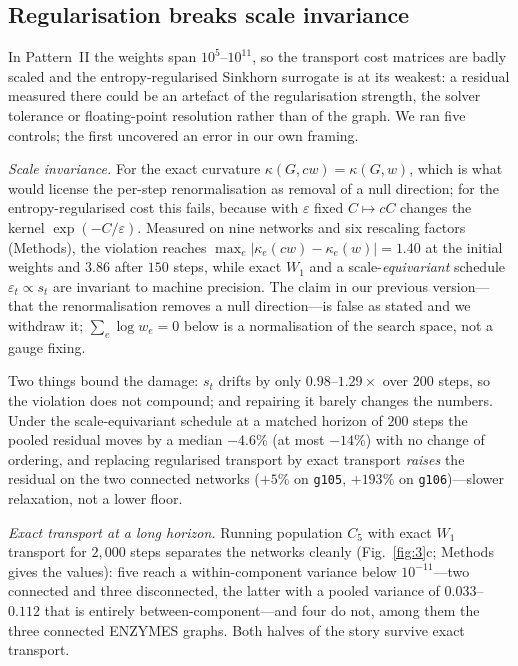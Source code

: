 \documentclass[11pt]{article}
\begin{document}
\subsection*{Regularisation breaks scale invariance}

In Pattern~II the weights span $10^{5}$--$10^{11}$, so the transport cost
matrices are badly scaled and the entropy-regularised Sinkhorn surrogate is at
its weakest: a residual measured there could be an artefact of the
regularisation strength, the solver tolerance or floating-point resolution
rather than of the graph. We ran five controls; the first uncovered
an error in our own framing.

\emph{Scale invariance.} For the exact curvature
$\kappa(G,cw)=\kappa(G,w)$, which is what would license the per-step
renormalisation as removal of a null direction; for the entropy-regularised
cost this fails, because with $\varepsilon$ fixed $C\mapsto cC$ changes the
kernel $\exp(-C/\varepsilon)$. Measured on nine networks and six rescaling
factors (Methods), the violation reaches
$\max_e|\kappa_e(cw)-\kappa_e(w)|=1.40$ at the initial weights and $3.86$
after $150$ steps, while exact $W_1$ and a scale-\emph{equivariant} schedule
$\varepsilon_t\propto s_t$ are invariant to machine precision. The claim in our
previous version---that the renormalisation removes a null direction---is false
as stated and we withdraw it; $\sum_e\log w_e=0$ below is a normalisation of
the search space, not a gauge fixing.

Two things bound the damage: $s_t$ drifts by only $0.98$--$1.29\times$ over
$200$ steps, so the violation does not compound; and repairing it barely
changes the numbers. Under the scale-equivariant schedule at a matched horizon
of $200$ steps the pooled residual moves by a median $-4.6\%$ (at most $-14\%$)
with no change of ordering, and replacing regularised transport by exact
transport \emph{raises} the residual on the two connected networks ($+5\%$ on
\texttt{g105}, $+193\%$ on \texttt{g106})---slower relaxation, not a lower
floor.

\emph{Exact transport at a long horizon.} Running population $C_5$ with exact
$W_1$ transport for $2{,}000$ steps separates the networks cleanly
(Fig.~\ref{fig:3}c; Methods gives the values): five reach a within-component
variance below $10^{-11}$---two connected and three disconnected, the latter
with a pooled variance of $0.033$--$0.112$ that is entirely
between-component---and four do not, among them the three connected ENZYMES
graphs. Both halves of the story survive exact transport.
\end{document}
